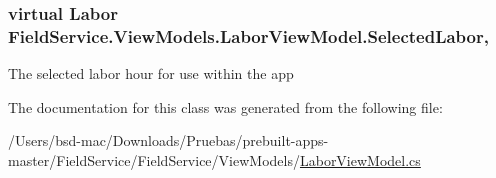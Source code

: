 \hypertarget{class_field_service_1_1_view_models_1_1_labor_view_model_aabbeb138468e4e718cda010d38f5d9e1}{
\subsubsection[{Selected\+Labor}]{\setlength{\rightskip}{0pt plus 5cm}virtual {\bf Labor} Field\+Service.\+View\+Models.\+Labor\+View\+Model.\+Selected\+Labor\hspace{0.3cm}{\ttfamily [get]}, {\ttfamily [set]}}}\label{class_field_service_1_1_view_models_1_1_labor_view_model_aabbeb138468e4e718cda010d38f5d9e1}


The selected labor hour for use within the app 



The documentation for this class was generated from the following file\+:\begin{DoxyCompactItemize}
\item 
/\+Users/bsd-\/mac/\+Downloads/\+Pruebas/prebuilt-\/apps-\/master/\+Field\+Service/\+Field\+Service/\+View\+Models/\hyperlink{_view_models_2_labor_view_model_8cs}{Labor\+View\+Model.\+cs}\end{DoxyCompactItemize}
